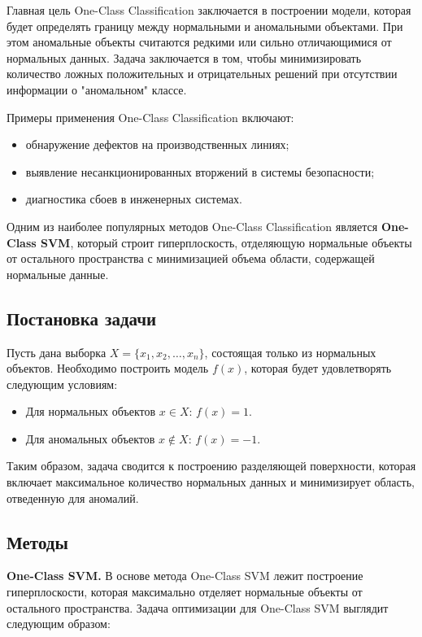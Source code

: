 Главная цель One-Class Classification заключается в построении модели, которая будет определять границу между нормальными и аномальными объектами. При этом аномальные объекты считаются редкими или сильно отличающимися от нормальных данных. Задача заключается в том, чтобы минимизировать количество ложных положительных и отрицательных решений при отсутствии информации о "аномальном" классе.

Примеры применения One-Class Classification включают:
\begin{itemize}
    \item обнаружение дефектов на производственных линиях;
    \item выявление несанкционированных вторжений в системы безопасности;
    \item диагностика сбоев в инженерных системах.
\end{itemize}

Одним из наиболее популярных методов One-Class Classification является \textbf{One-Class SVM}, который строит гиперплоскость, отделяющую нормальные объекты от остального пространства с минимизацией объема области, содержащей нормальные данные.

\subsection{Постановка задачи}

Пусть дана выборка \( X = \{x_1, x_2, \dots, x_n\} \), состоящая только из нормальных объектов. Необходимо построить модель \( f(x) \), которая будет удовлетворять следующим условиям:
\begin{itemize}
    \item Для нормальных объектов \( x \in X \): \( f(x) = 1 \).
    \item Для аномальных объектов \( x \notin X \): \( f(x) = -1 \).
\end{itemize}

Таким образом, задача сводится к построению разделяющей поверхности, которая включает максимальное количество нормальных данных и минимизирует область, отведенную для аномалий.

\subsection{Методы}

\textbf{One-Class SVM.} В основе метода One-Class SVM лежит построение гиперплоскости, которая максимально отделяет нормальные объекты от остального пространства. Задача оптимизации для One-Class SVM выглядит следующим образом:

